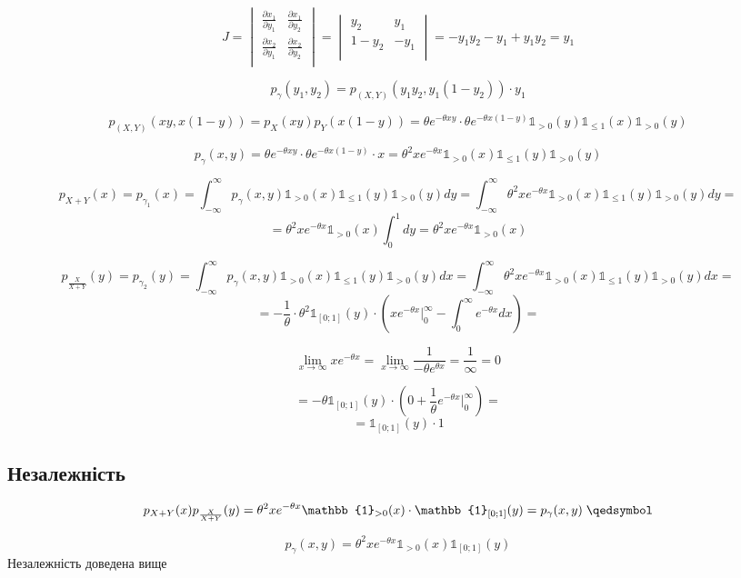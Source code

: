 \documentclass[11pt, a4paper]{article} %
\begin{document}
$$
J = \begin{vmatrix}
    \frac{\partial x_1}{\partial y_1} & \frac{\partial x_1}{\partial y_2} \\
    \frac{\partial x_2}{\partial y_1} & \frac{\partial x_2}{\partial y_2} \\
\end{vmatrix} 
= \begin{vmatrix}
    y_2 & y_1 \\
    1-y_2 & -y_1 \\
\end{vmatrix} = -y_1y_2 - y_1 + y_1 y_2 = y_1
$$

$$p_\gamma(y_1,y_2) = p_{(X,Y)} (y_1 y_2, y_1(1-y_2)) \cdot y_1$$

$$p_{(X,Y)} (x y, x (1-y)) = p_X(xy) p_Y(x(1-y)) 
= \theta e^{-\theta xy} \cdot \theta e^{-\theta x(1-y)} \mathbb{1}_{> 0}(y)\mathbb{1}_{\le 1}(x)\mathbb{1}_{> 0}(y) $$

$$p_\gamma(x,y) = \theta e^{-\theta xy} \cdot \theta e^{-\theta x(1-y)} \cdot x
= \theta^2 xe^{-\theta x} \mathbb{1}_{> 0}(x)\mathbb{1}_{\le 1}(y)\mathbb{1}_{> 0}(y)$$

$$p_{X+Y}(x) = p_{\gamma_1}(x) = \int_{-\infty}^\infty p_\gamma(x,y)\mathbb{1}_{> 0}(x)\mathbb{1}_{\le 1}(y)\mathbb{1}_{> 0}(y) dy 
= \int_{-\infty}^\infty \theta^2 xe^{-\theta x}\mathbb{1}_{> 0}(x)\mathbb{1}_{\le 1}(y)\mathbb{1}_{> 0}(y) dy =$$
$$= \theta^2 xe^{-\theta x}\mathbb{1}_{> 0}(x) \int_{0}^1 dy = \theta^2 xe^{-\theta x}\mathbb{1}_{> 0}(x) $$

$$p_{\frac{X}{X+Y}}(y) = p_{\gamma_2}(y) = \int_{-\infty}^\infty p_\gamma(x,y)\mathbb{1}_{> 0}(x)\mathbb{1}_{\le 1}(y)\mathbb{1}_{> 0}(y) dx 
= \int_{-\infty}^\infty \theta^2 xe^{-\theta x}\mathbb{1}_{> 0}(x)\mathbb{1}_{\le 1}(y)\mathbb{1}_{> 0}(y) dx =$$
$$= -\frac{1}{\theta}\cdot \theta^2 \mathbb{1}_{[0;1]}(y) \cdot \left(xe^{-\theta x}|_{0}^\infty - \int_{0}^\infty e^{-\theta x}dx \right) = $$
\begin{mdframed}[backgroundcolor=violet!10]
    $$\lim_{x\to\infty} xe^{-\theta x} = \lim_{x\to\infty} \frac{1}{-\theta e^{\theta x}} = \frac{1}{\infty} = 0$$
\end{mdframed}
$$= -\theta \mathbb{1}_{[0;1]}(y) \cdot \left(0 + \frac{1}{\theta}  e^{-\theta x} |_0^\infty\right) = $$
$$= \mathbb{1}_{[0;1]}(y) \cdot 1$$

\subsection*{Незалежність}

$$p_{X+Y}(x)p_{\frac{X}{X+Y}}(y) = \theta^2 xe^{-\theta x}\mathbb{1}_{> 0}(x) \cdot \mathbb{1}_{[0;1]}(y) = p_\gamma(x,y) \; \qedsymbol$$

\begin{mdframed}[style=ans]
    
    $$p_\gamma(x,y) =\theta^2 xe^{-\theta x} \mathbb{1}_{> 0}(x)\mathbb{1}_{[0;1]}(y)$$
    Незалежність доведена вище
\end{mdframed}
\end{document}
